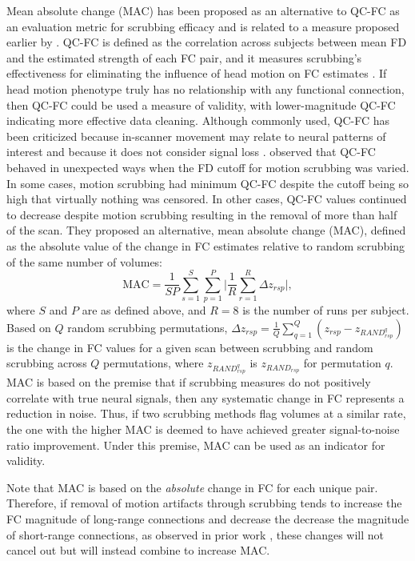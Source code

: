\documentclass{article}
\begin{document}
Mean absolute change (MAC) has been proposed as an alternative to QC-FC as an evaluation metric for scrubbing efficacy \citep{williams2022advancing} and is related to a measure proposed earlier by \cite{powerMethodsDetectCharacterize2014}.  %
QC-FC is defined as the correlation across subjects between mean FD and the estimated strength of each FC pair, and it measures scrubbing's effectiveness for eliminating the influence of head motion on FC estimates \citep{powerSpuriousSystematicCorrelations2012, satterthwaiteImpactInScannerHead2012}. If head motion phenotype truly has no relationship with any functional connection, then QC-FC could be used a measure of validity, with lower-magnitude QC-FC indicating more effective data cleaning. Although commonly used, QC-FC has been criticized because in-scanner movement may relate to neural patterns of interest and because it does not consider signal loss \citep{williams2022advancing,raval2022pitfalls}. \cite{williams2022advancing} observed that QC-FC behaved in unexpected ways when the FD cutoff for motion scrubbing was varied. In some cases, motion scrubbing had minimum QC-FC despite the cutoff being so high that virtually nothing was censored. In other cases, QC-FC values continued to decrease despite motion scrubbing resulting in the removal of more than half of the scan. They proposed an alternative, mean absolute change (MAC), defined as the absolute value of the change in FC estimates relative to random scrubbing of the same number of volumes:
$$
\textrm{MAC}=\frac{1}{SP}\sum^{S}_{s=1}{\sum^{P}_{p=1}{\bigl\lvert\frac{1}{R}\sum^{R}_{r=1}\Delta z_{rsp}\bigr\rvert}},
$$
where $S$ and $P$ are as defined above, and $R=8$ is the number of runs per subject. Based on $Q$ random scrubbing permutations, $\Delta z_{rsp} = \frac{1}{Q}\sum^{Q}_{q=1}\left(z_{rsp} - z_{{RAND}_{rsp}^q}\right)$ is the change in FC values for a given scan between scrubbing and random scrubbing across $Q$ permutations, where $z_{{RAND}_{rsp}^q}$ is $z_{{RAND}_{rsp}}$ for permutation $q$. {MAC} is based on the premise that if scrubbing measures do not positively correlate with true neural signals, then any systematic change in FC represents a reduction in noise. Thus, if two scrubbing methods flag volumes at a similar rate, the one with the higher MAC is deemed to have achieved greater signal-to-noise ratio improvement. Under this premise, MAC can be used as an indicator for validity. 

Note that MAC is based on the \textit{absolute} change in FC for each unique pair. Therefore, if removal of motion artifacts through scrubbing tends to increase the FC magnitude of long-range connections and decrease the decrease the magnitude of short-range connections, as observed in prior work \citep{powerSpuriousSystematicCorrelations2012}, these changes will not cancel out but will instead combine to increase MAC.
\end{document}
